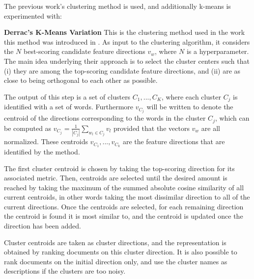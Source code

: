 


The previous work's clustering method is used, and additionally k-means is experimented with:

\noindent \textbf{Derrac's K-Means Variation} This is the clustering method used in the work this method was introduced in \cite{derrac2015}. As input to the clustering algorithm, it considers the $N$ best-scoring candidate feature directions $v_w$, where $N$ is a hyperparameter. The main idea underlying their approach is to select the cluster centers such that (i) they are among the top-scoring candidate feature directions, and (ii) are as close to being orthogonal to each other as possible. 
 
The output of this step is a set of clusters $C_1,...,C_K$, where each cluster $C_j$ is identified with a set of words.
Furthermore  $v_{C_j}$ will be written to denote the centroid of the directions corresponding to the words in the cluster $C_j$, which can be computed as $v_{C_j}= \frac{1}{|C_j|} \sum_{w_l\in C_j} v_l$ provided that the vectors $v_w$ are all normalized. These centroids $v_{C_1},...,v_{C_k}$ are the feature directions that are identified by the method. 

The first cluster centroid is chosen by taking the top-scoring direction for its associated metric. Then, centroids are selected until the desired amount is reached by taking the maximum of the summed absolute cosine similarity of all current centroids, in other words taking the most dissimilar direction to all of the current directions. Once the centroids are selected, for each remaining direction the centroid is found it is most similar to, and the centroid is updated once the direction has been added. 

Cluster centroids are taken as cluster directions, and the representation is obtained by ranking documents on this cluster direction. It is also possible to rank documents on the initial direction only, and use the cluster names as descriptions if the clusters are too noisy.

